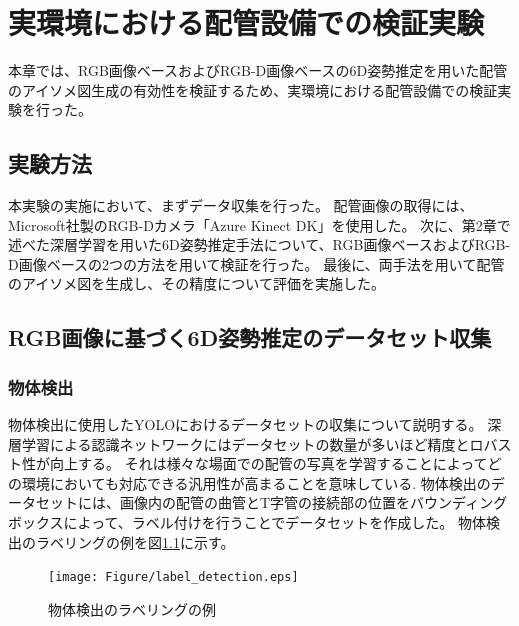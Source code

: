 ﻿\chapter{実環境における配管設備での検証実験}
本章では、RGB画像ベースおよびRGB-D画像ベースの6D姿勢推定を用いた配管のアイソメ図生成の有効性を検証するため、実環境における配管設備での検証実験を行った。

\section{実験方法}
本実験の実施において、まずデータ収集を行った。
配管画像の取得には、Microsoft社製のRGB-Dカメラ「Azure Kinect DK」を使用した。
次に、第2章で述べた深層学習を用いた6D姿勢推定手法について、RGB画像ベースおよびRGB-D画像ベースの2つの方法を用いて検証を行った。
最後に、両手法を用いて配管のアイソメ図を生成し、その精度について評価を実施した。

\section{RGB画像に基づく6D姿勢推定のデータセット収集}

\subsection{物体検出}
物体検出に使用したYOLOにおけるデータセットの収集について説明する。
深層学習による認識ネットワークにはデータセットの数量が多いほど精度とロバスト性が向上する。
それは様々な場面での配管の写真を学習することによってどの環境においても対応できる汎用性が高まることを意味している.
物体検出のデータセットには、画像内の配管の曲管とT字管の接続部の位置をバウンディングボックスによって、ラベル付けを行うことでデータセットを作成した。
物体検出のラベリングの例を図\ref{fig:f1}に示す。
\begin{figure}[htbt]
	\centering
	 \texttt{[image: Figure/label\_detection.eps]}
	 \caption{物体検出のラベリングの例}
	 \label{fig:f1}
\end{figure}

